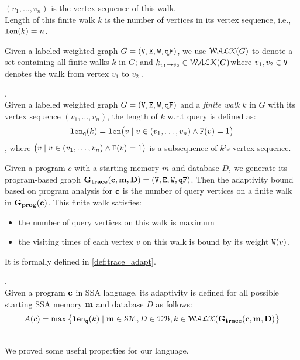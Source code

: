 \documentclass[a4paper,11pt]{article}
\begin{document}
{\begin{defn}
\begin{itemize}
\end{itemize}
$(v_1, \ldots, v_{n})$ is the vertex sequence of this walk.
\\
%
Length of this finite walk $k$ is the number of vertices in its vertex sequence, i.e., $\mathtt{len}(k) = n$.
\end{defn}
%
Given a labeled weighted graph $G = (\mathtt{V}, \mathtt{E}, \mathtt{W}, \mathtt{qF})$, 
we use $\mathcal{WALK}(G)$ to denote a set containing all finite walks $k$ in $G$;
and $k_{v_1 \to v_2} \in \mathcal{WALK}(G)$where $v_1, v_2 \in \mathtt{V}$ denotes the walk from vertex $v_1$ to $v_2$ .
%
%
\begin{defn}.
\label{def:qlen}
\\
Given a labeled weighted graph $G = (\mathtt{V}, \mathtt{E}, \mathtt{W}, \mathtt{qF})$ and a \emph{finite walk} $k$ in $G$ with its vertex sequence $(v_1, \ldots, v_{n})$, the length of $k$ w.r.t query is defined as:
\[
	\mathtt{len}_{\tt q}(k) = \mathtt{len}\big(
	v \mid v \in (v_1, \ldots, v_{n}) \land \mathtt{F}(v) = 1 \big)
\]
, where $\big(v \mid v \in (v_1, \ldots, v_{n}) \land \mathtt{F}(v) = 1 \big)$ is a subsequence of $k$'s vertex sequence.
\end{defn}
%
Given a program $c$ with a starting memory $m$ and database $D$, we generate its program-based graph 
$\bf{G_{trace}}(c, m, D) = (\mathtt{V}, \mathtt{E}, \mathtt{W}, \mathtt{qF})$.
%
Then the adaptivity bound based on program analysis for ${\boldsymbol{\mathbf{c}}}$ is the number of query vertices on a finite walk in $\mathtt{\bf{G_{prog}}}({\boldsymbol{\mathbf{c}}})$. This finite walk satisfies:
%
\begin{itemize}
\item the number of query vertices on this walk is maximum
\item the visiting times of each vertex $v$ on this walk is bound by its weight $\mathtt{W}(v)$.
\end{itemize}
%
It is formally defined in \ref{def:trace_adapt}.
%
\begin{defn}
.
\label{def:trace_adapt}
\\
Given a program ${\boldsymbol{\mathbf{c}}}$ in SSA language, 
its adaptivity is defined for all possible starting SSA memory ${\boldsymbol{\mathbf{m}}}$ and database $D$ as follows:
%
$$
A(c) = \max \big 
\{ \mathtt{len}_{\tt q}(k) \mid {\boldsymbol{\mathbf{m}}} \in \mathcal{SM},D \in \mathcal{DB} , k \in \mathcal{WALK}(\bf{G_{trace}}(c, m, D) \big \} 
$$
\end{defn}
}
\\
%
%
We proved some useful properties for our language.
\\
%
\end{document}
